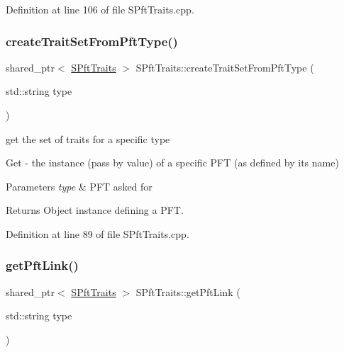 Definition at line 106 of file S\+Pft\+Traits.\+cpp.

\mbox{\label{class_s_pft_traits_ad5ae63e54ff232f592ef14d18f961368}} 
\subsubsection{\texorpdfstring{createTraitSetFromPftType()}{createTraitSetFromPftType()}}
{\footnotesize\ttfamily shared\+\_\+ptr$<$ \mbox{\hyperlink{class_s_pft_traits}{S\+Pft\+Traits}} $>$ S\+Pft\+Traits\+::create\+Trait\+Set\+From\+Pft\+Type (\begin{DoxyParamCaption}\item[{std\+::string}]{type }\end{DoxyParamCaption})\hspace{0.3cm}{\ttfamily [static]}}



get the set of traits for a specific type 

Get -\/ the instance (pass by value) of a specific P\+FT (as defined by its name) 
\begin{DoxyParams}{Parameters}
{\em type} & P\+FT asked for \\
\hline
\end{DoxyParams}
\begin{DoxyReturn}{Returns}
Object instance defining a P\+FT. 
\end{DoxyReturn}


Definition at line 89 of file S\+Pft\+Traits.\+cpp.

\mbox{\label{class_s_pft_traits_a45c12aa12c09c72da36d303a646fc645}} 
\subsubsection{\texorpdfstring{getPftLink()}{getPftLink()}}
{\footnotesize\ttfamily shared\+\_\+ptr$<$ \mbox{\hyperlink{class_s_pft_traits}{S\+Pft\+Traits}} $>$ S\+Pft\+Traits\+::get\+Pft\+Link (\begin{DoxyParamCaption}\item[{std\+::string}]{type }\end{DoxyParamCaption})\hspace{0.3cm}{\ttfamily [static]}}



